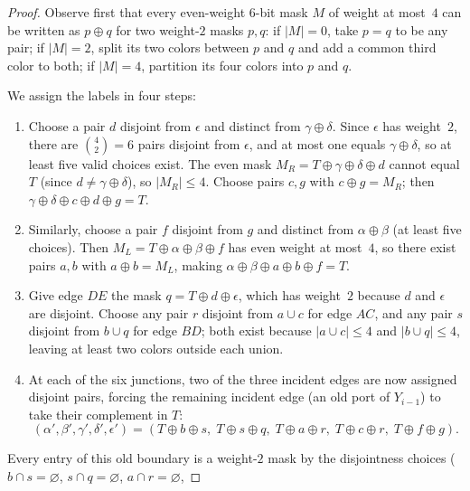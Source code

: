 \documentclass[11pt]{article}
\begin{document}
\begin{proof}
Observe first that every even-weight $6$-bit mask $M$ of weight at most~$4$ can be
written as $p \oplus q$ for two weight-$2$ masks $p, q$: if $|M| = 0$, take $p = q$ to be
any pair; if $|M| = 2$, split its two colors between $p$ and $q$ and add a common third
color to both; if $|M| = 4$, partition its four colors into $p$ and $q$.

We assign the labels in four steps:
\begin{enumerate}
  \item Choose a pair $d$ disjoint from $\epsilon$ and distinct from
        $\gamma \oplus \delta$. Since $\epsilon$ has weight~$2$, there are
        $\binom{4}{2} = 6$ pairs disjoint from $\epsilon$, and at most one equals
        $\gamma \oplus \delta$, so at least five valid choices exist. The even mask
        $M_R = T \oplus \gamma \oplus \delta \oplus d$ cannot equal $T$ (since
        $d \neq \gamma \oplus \delta$), so $|M_R| \le 4$. Choose pairs $c, g$ with
        $c \oplus g = M_R$; then $\gamma \oplus \delta \oplus c \oplus d \oplus g = T$.
  \item Similarly, choose a pair $f$ disjoint from $g$ and distinct from
        $\alpha \oplus \beta$ (at least five choices). Then
        $M_L = T \oplus \alpha \oplus \beta \oplus f$ has even weight at most~$4$, so
        there exist pairs $a, b$ with $a \oplus b = M_L$, making
        $\alpha \oplus \beta \oplus a \oplus b \oplus f = T$.
  \item Give edge $DE$ the mask $q = T \oplus d \oplus \epsilon$, which has weight~$2$
        because $d$ and $\epsilon$ are disjoint. Choose any pair $r$ disjoint from
        $a \cup c$ for edge $AC$, and any pair $s$ disjoint from $b \cup q$ for edge
        $BD$; both exist because $|a \cup c| \le 4$ and $|b \cup q| \le 4$, leaving at
        least two colors outside each union.
  \item At each of the six junctions, two of the three incident edges are now assigned
        disjoint pairs, forcing the remaining incident edge (an old port of $Y_{i-1}$) to
        take their complement in $T$:
        \[
          (\alpha', \beta', \gamma', \delta', \epsilon')
          = (T \oplus b \oplus s,\; T \oplus s \oplus q,\;
             T \oplus a \oplus r,\; T \oplus c \oplus r,\; T \oplus f \oplus g).
        \]
\end{enumerate}
Every entry of this old boundary is a weight-$2$ mask by the disjointness choices
($b \cap s = \varnothing$, $s \cap q = \varnothing$, $a \cap r = \varnothing$,

\end{proof}
\end{document}
